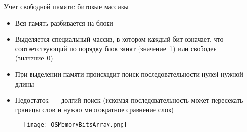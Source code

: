 \documentclass[aspectratio=169,14pt]{beamer}
\begin{document}
\begin{frame}{Учет свободной памяти: битовые массивы}
    \begin{itemize}
        \item Вся память разбивается на блоки
        \item Выделяется специальный массив, в котором каждый бит означает,
        что соответствующий по порядку блок занят (значение~1) или свободен
        (значение~0)
        \item При выделении памяти происходит поиск последовательности
        нулей нужной длины
        \item Недостаток~--- долгий поиск (искомая последовательность может
        пересекать границы слов и нужно многократное сравнение слов)
    \end{itemize}
    \begin{figure}[htp]
        \centering
        \texttt{[image: OSMemoryBitsArray.png]}
    \end{figure}
\end{frame}
\end{document}
